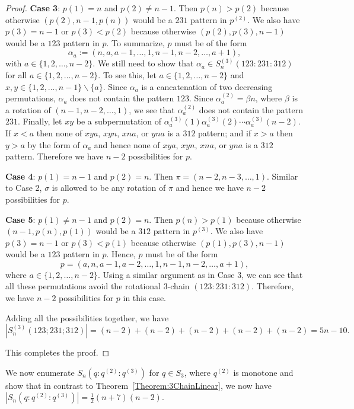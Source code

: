 \documentclass[11pt]{article}
\theoremstyle{definition}
\newcommand{\half}{{\textstyle\frac12}}
\numberwithin{equation}{section}
\begin{document}
\begin{proof}
{\bf Case 3}: $p(1)=n$ and $p(2)\neq n-1$. Then $p(n)>p(2)$ because otherwise $(p(2),n-1,p(n))$ would be a $231$ pattern in $p^{(2)}$.
We also have $p(3)=n-1$ or $p(3)<p(2)$ because otherwise $(p(2),p(3),n-1)$ would be a $123$ pattern in $p$. To summarize, $p$ must be of the form \[\alpha_a:=(n,a,a-1,\ldots,1,n-1,n-2,\ldots,a+1),\]
with $a\in\{1,2,\ldots,n-2\}$. We still need to show that $\alpha_a\in S_n^{(3)}(123:231:312)$ for all $a\in\{1,2,\ldots,n-2\}$. To see this, let $a\in\{1,2,\ldots,n-2\}$ and $x,y\in\{1,2,\ldots,n-1\}\backslash\{a\}$. Since $\alpha_a$ is a cancatenation of two decreasing permutations, $\alpha_a$ does not contain the pattern $123$. Since $\alpha_a^{(2)}=\beta n$, where $\beta$ is a rotation of $(n-1,n-2,\ldots,1)$, we see that $\alpha_a^{(2)}$ does not contain the pattern $231$. Finally, let $xy$ be a 
subpermutation of $\alpha_a^{(3)}(1)\alpha_a^{(3)}(2)\cdots\alpha_a^{(3)}(n-2)$. If $x<a$ then none of $xya$, $xyn$, $xna$, or $yna$ is a $312$ pattern; and if $x>a$ then $y>a$ by the form of $\alpha_a$ and hence none of $xya$, $xyn$, $xna$, or $yna$ is a $312$ pattern. 
Therefore we have $n-2$ possibilities for $p$.

{\bf Case 4}: $p(1)=n-1$ and $p(2)=n$. Then $\pi=(n-2,n-3,\ldots,1)$. Similar to Case 2, $\sigma$ is allowed to be any rotation of $\pi$ and hence we have $n-2$ possibilities for $p$.

{\bf Case 5}: $p(1)\neq n-1$ and $p(2)=n$. Then $p(n)>p(1)$ because otherwise $(n-1,p(n),p(1))$ would be a $312$ pattern in $p^{(3)}$. We also have $p(3)=n-1$ or $p(3)<p(1)$ because otherwise $(p(1),p(3),n-1)$ would be a $123$ pattern in $p$. Hence, $p$ must be of the form
\[p=(a,n,a-1,a-2,\ldots,1,n-1,n-2,\ldots,a+1),
\]
where $a\in\{1,2,\ldots,n-2\}$. Using a similar argument as in Case 3, we can see that all these permutations avoid the rotational 3-chain $(123:231:312)$. Therefore, we have $n-2$ possibilities for $p$ in this case.

Adding all the possibilities together, we have \[|S_n^{(3)}(123;231;312)|=(n-2)+(n-2)+(n-2)+(n-2)+(n-2)=5n-10.\]

This completes the proof.
\end{proof}

We now enumerate $S_n(q:q^{(2)}:q^{(3)})$ for $q\in S_3$, where $q^{(2)}$ is monotone
and show that in contrast to Theorem~\ref{Theorem:3ChainLinear}, we now have $|S_n(q:q^{(2)}:q^{(3)})|=\half (n+7)(n-2)$.
\end{document}
